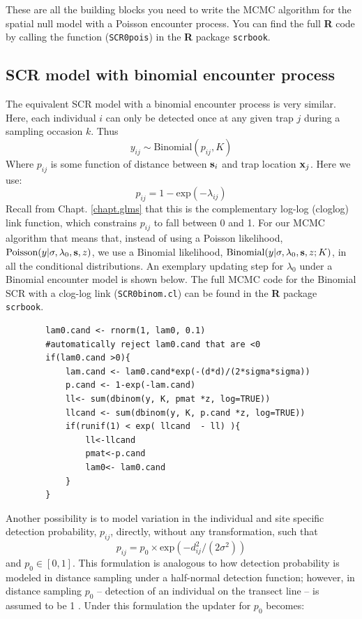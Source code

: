 These are all the building blocks you need to write the MCMC algorithm
for the spatial null model with a Poisson encounter process.  You can
find the full {\bf R} code by calling the function (\mbox{\tt SCR0pois}) in the {\bf R} package 
\mbox{\tt scrbook}.

\subsection{SCR model with binomial encounter process}
The equivalent SCR model with a binomial encounter process is very
similar. Here, each individual $i$ can only be detected once at any
given trap $j$ during a sampling occasion $k$.  Thus
\[
y_{ij} \sim \mbox{Binomial} (p_{ij}, K)
\]
Where $p_{ij}$ is some function of distance between ${\bf s}_{i}$ and trap location ${\bf x}_{j}$. Here we use:
\[
p_{ij}=1-\mbox{exp}(-\lambda_{ij})
\]
Recall from Chapt. \ref{chapt.glms} that this is the complementary log-log (cloglog) link function, which constrains $p_{ij}$ 
to fall between 0 and 1.
For our MCMC algorithm that means that, instead of using a Poisson 
likelihood, $\mbox{Poisson}(y|\sigma,\lambda_0,{\bf s},z)$, we use a 
Binomial likelihood, $\mbox{Binomial}(y| \sigma,\lambda_0,{\bf s},z; K)$, 
in all the conditional distributions. An exemplary updating step for $\lambda_0$ under a Binomial encounter model is shown below. 
The full MCMC code for the Binomial SCR with a clog-log link (\mbox{\tt SCR0binom.cl}) 
can be found in the {\bf R} package \mbox{\tt scrbook}.

\begin{verbatim}
        lam0.cand <- rnorm(1, lam0, 0.1)
        #automatically reject lam0.cand that are <0
        if(lam0.cand >0){   
            lam.cand <- lam0.cand*exp(-(d*d)/(2*sigma*sigma))
            p.cand <- 1-exp(-lam.cand)
            ll<- sum(dbinom(y, K, pmat *z, log=TRUE))  
            llcand <- sum(dbinom(y, K, p.cand *z, log=TRUE))
            if(runif(1) < exp( llcand  - ll) ){
                ll<-llcand
                pmat<-p.cand
                lam0<- lam0.cand
            }
        }
\end{verbatim}

Another possibility is to model variation in the individual and site 
specific detection probability,  $p_{ij}$, directly, without any 
transformation, such that
\[
p_{ij} = p_0 \times \mbox{exp}(-d_{ij}^2/(2\sigma^2))
\]
and $p_0 \in [0,1]$.
This formulation is analogous to how detection probability is modeled 
in distance sampling under a half-normal detection function; however, 
in distance sampling $p_0$ -- detection of an individual on the transect 
line -- is assumed to be 1 \citep{buckland_etal:2001}. Under this 
formulation the updater for $p_0$ becomes:

